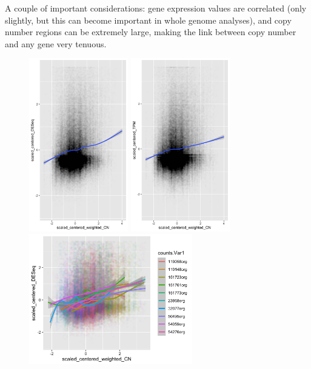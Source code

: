 \documentclass{article}
\begin{document}
\medskip

A couple of important considerations: gene expression values are correlated (only slightly, but this can become important in whole genome analyses), and copy number regions can be extremely large, making the link between copy number and any gene very tenuous.

\begin{figure}[h]
\centering
\includegraphics[width=1.7in]{../../RNASeq_and_CN/figures/scatterplot_normCNweighted_normDESeq_nonormal.png}
\includegraphics[width=1.7in]{../../RNASeq_and_CN/figures/scatterplot_normCNweighted_normTPM_nonormal.png}
\includegraphics[width=2.8in]{../../RNASeq_and_CN/figures/scatterplot_normCNweighted_normDESeq_perorg2_subsetorgs.png}\\

\end{figure}
\end{document}
